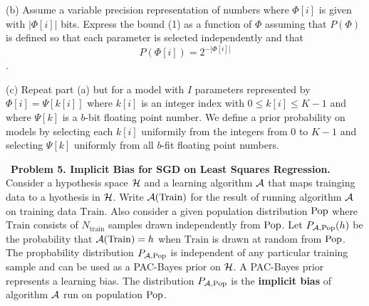 \documentclass{article}
\newcommand{\solution}[1]{}
\begin{document}
\solution{
  $${\cal L}(\Phi) \leq \frac{10}{9}\parens{\hat{\cal L}(\Phi) + \frac{5 L_\mathrm{max}}{N}\parens{16d\ln 2 + \ln\frac{1}{\delta}}}$$
}

\medskip
(b) Assume a variable precision representation of numbers where $\Phi[i]$ is given with $|\Phi[i]|$ bits.  Express the bound (1) as a function of $\Phi$ assuming that $P(\Phi)$
is defined so that each parameter is selected independently and that
$$P(\Phi[i]) = 2^{-|\Phi[i]|}$$.

\solution{
  \begin{eqnarray*}
    {\cal L}(h) & \leq & \frac{10}{9}\parens{\hat{\cal L}(h) + \frac{5 L_\mathrm{max}}{N_{\mathrm{train}}}\parens{\ln 2|\Phi| + \ln\frac{1}{\delta}}} \\
    \\
    |\Phi| & = & \sum_i |\Phi[i]|
  \end{eqnarray*}
}

\medskip
(c) Repeat part (a) but for a model with $I$ parameters represented by
$\Phi[i] = \Psi[k[i]]$ where $k[i]$ is an integer index with $0 \leq k[i] \leq K-1$ and where $\Psi[k]$ is a $b$-bit floating point number.  We define a prior probability on models
by selecting each $k[i]$ uniformily from the integers from $0$ to $K-1$ and selecting $\Psi[k]$ uniformly from all $b$-fit floating point numbers.

\solution{
  $${\cal L}(h) \leq \frac{10}{9}\parens{\hat{\cal L}(h) + \frac{5 L_\mathrm{max}}{N}\parens{Kb\ln 2 + I\ln k + \ln\frac{1}{\delta}}}$$
  For $I >> K$ this is a much tighter bound than using floating point or even integer representations of parameters.  It is a much more compact representaiton
  of the parameters.
}

\medskip
~{\bf Problem 5. Implicit Bias for SGD on Least Squares Regression.}  Consider a hypothesis space ${\cal H}$ and a learning algorithm ${\cal A}$
that maps trainging data to a hyothesis in ${\cal H}$.  Write ${\cal A}(\mathrm{Train})$ for the result of running algorithm ${\cal A}$ on training data $\mathrm{Train}$.
Also consider a given population distribution $\mathrm{Pop}$ where $\mathrm{Train}$ consists of $N_{\mathrm{train}}$ samples drawn independently from $\mathrm{Pop}$.
Let $P_{{\cal A},\mathrm{Pop}}(h)$ be the probability that ${\cal A}(\mathrm{Train}) = h$
when $\mathrm{Train}$ is drawn at random from $\mathrm{Pop}$.  The propbability distribution $P_{{\cal A},\mathrm{Pop}}$ is independent of any particular training sample
and can be used as a PAC-Bayes prior on ${\cal H}$. A PAC-Bayes prior represents a learning bias.
The distribution $P_{{\cal A},\mathrm{Pop}}$ is the {\bf implicit bias} of algorithm ${\cal A}$ run on population $\mathrm{Pop}$.
\end{document}
